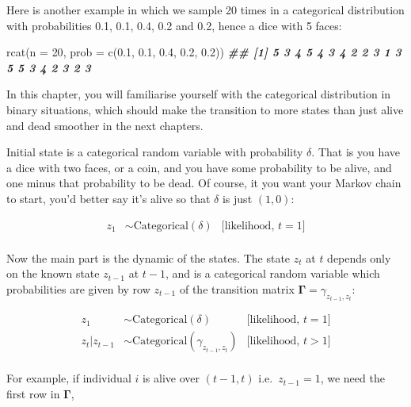 \documentclass[
  12pt,
]{krantz}
\newenvironment{Shaded}{\begin{snugshade}}{\end{snugshade}}
\newcommand{\AttributeTok}[1]{\textcolor[rgb]{0.77,0.63,0.00}{#1}}
\newcommand{\DecValTok}[1]{\textcolor[rgb]{0.00,0.00,0.81}{#1}}
\newcommand{\DocumentationTok}[1]{\textcolor[rgb]{0.56,0.35,0.01}{\textbf{\textit{#1}}}}
\newcommand{\FloatTok}[1]{\textcolor[rgb]{0.00,0.00,0.81}{#1}}
\newcommand{\FunctionTok}[1]{\textcolor[rgb]{0.00,0.00,0.00}{#1}}
\newcommand{\NormalTok}[1]{#1}
\begin{document}
Here is another example in which we sample 20 times in a categorical distribution with probabilities 0.1, 0.1, 0.4, 0.2 and 0.2, hence a dice with 5 faces:

\begin{Shaded}
\begin{Highlighting}[]
\FunctionTok{rcat}\NormalTok{(}\AttributeTok{n =} \DecValTok{20}\NormalTok{, }\AttributeTok{prob =} \FunctionTok{c}\NormalTok{(}\FloatTok{0.1}\NormalTok{, }\FloatTok{0.1}\NormalTok{, }\FloatTok{0.4}\NormalTok{, }\FloatTok{0.2}\NormalTok{, }\FloatTok{0.2}\NormalTok{))}
\DocumentationTok{\#\#  [1] 5 3 4 5 4 3 4 2 2 3 1 3 5 5 3 4 2 3 2 3}
\end{Highlighting}
\end{Shaded}

In this chapter, you will familiarise yourself with the categorical distribution in binary situations, which should make the transition to more states than just alive and dead smoother in the next chapters.

Initial state is a categorical random variable with probability \(\delta\). That is you have a dice with two faces, or a coin, and you have some probability to be alive, and one minus that probability to be dead. Of course, it you want your Markov chain to start, you'd better say it's alive so that \(\delta\) is just \((1,0)\):

\begin{align*}
   z_1 &\sim \text{Categorical}(\delta) &\text{[likelihood, }t = 1 \text{]}\\
\end{align*}

Now the main part is the dynamic of the states. The state \(z_t\) at \(t\) depends only on the known state \(z_{t-1}\) at \(t-1\), and is a categorical random variable which probabilities are given by row \(z_{t-1}\) of the transition matrix \(\mathbf{\Gamma} = \gamma_{z_{t-1},z_{t}}\):

\begin{align*}
   z_1 &\sim \text{Categorical}(\delta) &\text{[likelihood, }t = 1 \text{]}\\
   z_t | z_{t-1} &\sim \text{Categorical}(\gamma_{z_{t-1},z_{t}}) &\text{[likelihood, }t > 1 \text{]}\\
\end{align*}

For example, if individual \(i\) is alive over \((t-1,t)\) i.e.~\(z_{t-1} = 1\), we need the first row in \(\mathbf{\Gamma}\),
\end{document}
